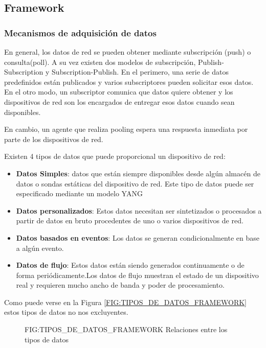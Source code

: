 \subsection{Framework}

\subsubsection{Mecanismos de adquisición de datos}

En general, los datos de red se pueden obtener mediante subscripción (push) o consulta(poll). A su vez existen dos modelos de subscripción, Publish-Subscription y Subscription-Publish. En el perimero, una serie de datos predefinidos están publicados y varios subscriptores pueden solicitar esos datos. En el otro modo, un subscriptor comunica que datos quiere obtener y los dispositivos de red son los encargados de entregar esos datos cuando sean disponibles.

En cambio, un agente que realiza pooling espera una respuesta inmediata por parte de los dispositivos de red. 

Existen 4 tipos de datos que puede proporcional un dispositivo de red:
\begin{itemize}
    \item \textbf{Datos Simples}: datos que están siempre disponibles desde algún almacén de datos o sondas estáticas del dispositivo de red. Este tipo de datos puede ser especificado mediante un modelo YANG
    \item \textbf{Datos personalizados}: Estos datos necesitan ser sintetizados o procesados a partir de datos en bruto procedentes de uno o varios dispositivos de red.
    \item \textbf{Datos basados en eventos}: Los datos se generan condicionalmente en base a algún evento.
    \item \textbf{Datos de flujo}: Estos datos están siendo generados continuamente o de forma periódicamente.Los datos de flujo muestran el estado de un dispositivo real y requieren mucho ancho de banda y poder de procesamiento.
\end{itemize}

Como puede verse en la Figura \ref{FIG:TIPOS_DE_DATOS_FRAMEWORK} estos tipos de datos no nos excluyentes.

\begin{figure}
    [Relaciones entre los tipos de datos]
    {FIG:TIPOS_DE_DATOS_FRAMEWORK}
    {Relaciones entre los tipos de datos}
\end{figure}



